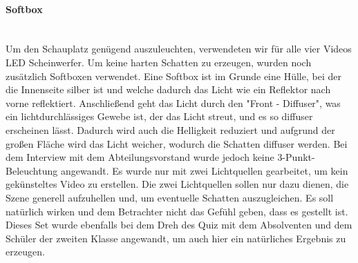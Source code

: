 \paragraph{Softbox}
\leavevmode \\
Um den Schauplatz genügend auszuleuchten, verwendeten wir für alle vier Videos LED Scheinwerfer. Um keine harten Schatten zu erzeugen, wurden noch zusätzlich Softboxen verwendet. Eine Softbox ist im Grunde eine Hülle, bei der
die Innenseite silber ist und welche dadurch das Licht wie ein Reflektor nach vorne reflektiert. Anschließend geht das Licht durch den "Front - Diffuser", was
ein lichtdurchlässiges Gewebe ist, der das Licht streut, und es so diffuser erscheinen lässt. Dadurch wird auch die Helligkeit reduziert und aufgrund der großen Fläche wird das Licht weicher, wodurch die Schatten diffuser werden. \newline
Bei dem Interview mit dem Abteilungsvorstand wurde jedoch keine 3-Punkt-Beleuchtung angewandt. Es wurde nur mit zwei Lichtquellen gearbeitet, um kein gekünsteltes Video zu erstellen. Die zwei Lichtquellen sollen nur dazu dienen, die Szene generell aufzuhellen und, um eventuelle Schatten auszugleichen. Es soll natürlich wirken und dem Betrachter nicht das Gefühl geben, dass es gestellt ist.  Dieses Set wurde ebenfalls bei dem Dreh des Quiz mit dem Absolventen und dem Schüler der zweiten Klasse angewandt, um auch hier ein natürliches Ergebnis zu erzeugen.